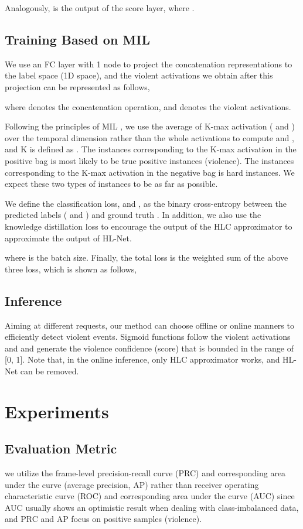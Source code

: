 \documentclass[runningheads]{llncs}
\begin{document}
Analogously,  is the output of the  score layer,
where  .


\subsection{Training Based on MIL}

We use an FC layer with 1 node to project the concatenation representations to the label space (1D space), and the violent activations we obtain after this projection can be represented as follows,
	 

where  denotes the concatenation operation, and  denotes the violent activations.

Following the principles of MIL \cite{sultani2018real,paul2018w}, we use the average of K-max activation (  and ) over the temporal dimension rather than the whole activations to compute  and , and K is defined as . The instances corresponding to the K-max activation in the positive bag is most likely to be true positive instances (violence). The instances corresponding to the K-max activation in the negative bag is hard instances. We expect these two types of instances to be as far as possible. 

We define the classification loss,  and , as the binary cross-entropy between the predicted labels ( and ) and ground truth . 
In addition, we also use the knowledge distillation loss to encourage the output of the HLC approximator to approximate the output of HL-Net.
	 

where  is the batch size.
Finally, the total loss is the weighted sum of the above three loss, which is shown as follows, 
	

\subsection{Inference}

Aiming at different requests, our method can choose offline or online manners to efficiently detect violent events. Sigmoid functions follow the violent activations  and  and generate the violence confidence (score) that is bounded in the range of [0, 1]. Note that, in the online inference, only HLC approximator works, and HL-Net can be removed.

\section{Experiments}

\subsection{Evaluation Metric}
we utilize the frame-level precision-recall curve (PRC) and corresponding area under the curve (average precision, AP) \cite{perez2019detection} rather than receiver operating characteristic curve (ROC) and corresponding area under the curve (AUC) \cite{wu2019deep,wu2020fast} since AUC usually shows an optimistic result when dealing with class-imbalanced data, and PRC and AP focus on positive samples (violence).
\end{document}
